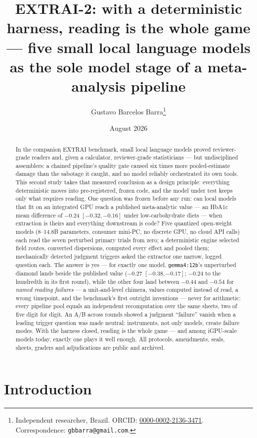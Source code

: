 \documentclass[11pt]{article}
\title{\textbf{EXTRAI-2: with a deterministic harness, reading is the whole game --- five small local language models as the sole model stage of a meta-analysis pipeline}}
\author{Gustavo Barcelos Barra\thanks{Independent researcher, Brazil. ORCID: \href{https://orcid.org/0000-0002-2136-3471}{0000-0002-2136-3471}. Correspondence: \texttt{gbbarra@gmail.com}.}}
\date{August 2026}
\begin{document}
\maketitle

\begin{abstract}
\noindent In the companion EXTRAI benchmark, small local language models proved reviewer-grade readers and, given a calculator, reviewer-grade statisticians --- but undisciplined assemblers: a chained pipeline's quality gate caused six times more pooled-estimate damage than the sabotage it caught, and no model reliably orchestrated its own tools. This second study takes that measured conclusion as a design principle: everything deterministic moves into pre-registered, frozen code, and the model under test keeps only what requires reading. One question was frozen before any run: can local models that fit on an integrated GPU reach a published meta-analytic value --- an HbA1c mean difference of $-0.24$ $[-0.32, -0.16]$ under low-carbohydrate diets --- when extraction is theirs and everything downstream is code? Five quantized open-weight models (8--14.8B parameters, consumer mini-PC, no discrete GPU, no cloud API calls) each read the seven perturbed primary trials from zero; a deterministic engine selected field routes, converted dispersions, computed every effect and pooled them; mechanically detected judgment triggers asked the extractor one narrow, logged question each. The answer is yes --- for exactly one model. \texttt{gemma4:12b}'s unperturbed diamond lands beside the published value ($-0.27$ $[-0.38, -0.17]$; $-0.24$ to the hundredth in its first round), while the other four land between $-0.44$ and $-0.54$ for \emph{named reading failures} --- a unit-and-level chimera, values computed instead of read, a wrong timepoint, and the benchmark's first outright inventions --- never for arithmetic: every pipeline pool equals an independent recomputation over the same sheets, two of five digit for digit. An A/B across rounds showed a judgment ``failure'' vanish when a leading trigger question was made neutral: instruments, not only models, create failure modes. With the harness closed, reading is the whole game --- and among iGPU-scale models today, exactly one plays it well enough. All protocols, amendments, seals, sheets, graders and adjudications are public and archived.
\end{abstract}

\section{Introduction}
\end{document}
